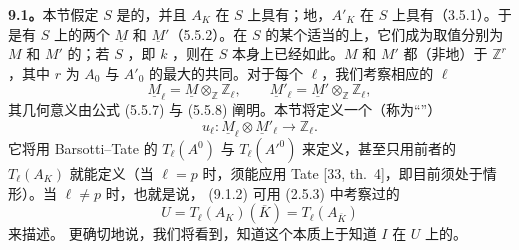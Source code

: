 \textbf{9.1。}本节假定 $S$ 是的，并且 $A_K$ 在 $S$ 上具有；地，$A'_K$ 在 $S$ 上具有（3.5.1）。于是有 $S$ 上的两个 $\underline M$ 和 $\underline M'$（5.5.2）。在 $S$ 的某个适当的上，它们成为取值分别为 $M$ 和 $M'$ 的；若 $S$ ，即 $k$ ，则在 $S$ 本身上已经如此。$M$ 和 $M'$ 都（非地）于 $\mathbb Z^r$，其中 $r$ 为 $A_0$ 与 $A'_0$ 的最大的共同。对于每个 $\ell$，我们考察相应的 $\ell$ 
\begin{equation}\tag{9.1.1}
 \underline M_\ell=\underline M\otimes_{\mathbb Z}\mathbb Z_\ell,
 \qquad \underline M'_\ell=\underline M'\otimes_{\mathbb Z}\mathbb Z_\ell,
\end{equation}
其几何意义由公式 (5.5.7) 与 (5.5.8) 阐明。本节将定义一个（称为“”）
\begin{equation}\tag{9.1.2}
 u_\ell:\underline M_\ell\otimes\underline M'_\ell\longrightarrow\mathbb Z_\ell.
\end{equation}
它将用 Barsotti--Tate 的 $T_\ell(A^0)$ 与 $T_\ell(A'^0)$ 来定义，甚至只用前者的 $T_\ell(A_K)$ 就能定义（当 $\ell=p$ 时，须能应用 Tate  [33, th.~4]，即目前须处于情形）。当 $\ell\ne p$ 时，也就是说， (9.1.2) 可用 (2.5.3) 中考察过的 
\begin{equation}\tag{9.1.3}
 U=T_\ell(A_K)(\overline K)=T_\ell(A_{\overline K})
\end{equation}
来描述。
更确切地说，我们将看到，知道这个本质上于知道 $I$ 在 $U$ 上的。

